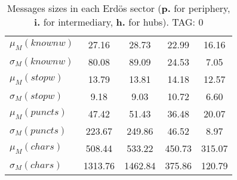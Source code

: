 \begin{table}[h!]
\begin{center}
\begin{tabular}{| l || c | c | c | c |}
$\mu_M(knownw)$ & 27.16  & 28.73  & 22.99  & 16.16 \\
$\sigma_M(knownw)$ & 80.08  & 89.09  & 24.53  & 7.05 \\\hline
$\mu_M(stopw)$ & 13.79  & 13.81  & 14.18  & 12.57 \\
$\sigma_M(stopw)$ & 9.18  & 9.03  & 10.72  & 6.60 \\\hline
$\mu_M(puncts)$ & 47.42  & 51.43  & 36.48  & 20.07 \\
$\sigma_M(puncts)$ & 223.67  & 249.86  & 46.52  & 8.97 \\\hline
$\mu_M(chars)$ & 508.44  & 533.22  & 450.73  & 315.07 \\
$\sigma_M(chars)$ & 1313.76  & 1462.84  & 375.86  & 120.79 \\\hline
\end{tabular}
\caption{Messages sizes in each Erd\"os sector ({{\bf p.}} for periphery, {{\bf i.}} for intermediary, {{\bf h.}} for hubs). TAG: 0}
\end{center}
\end{table}